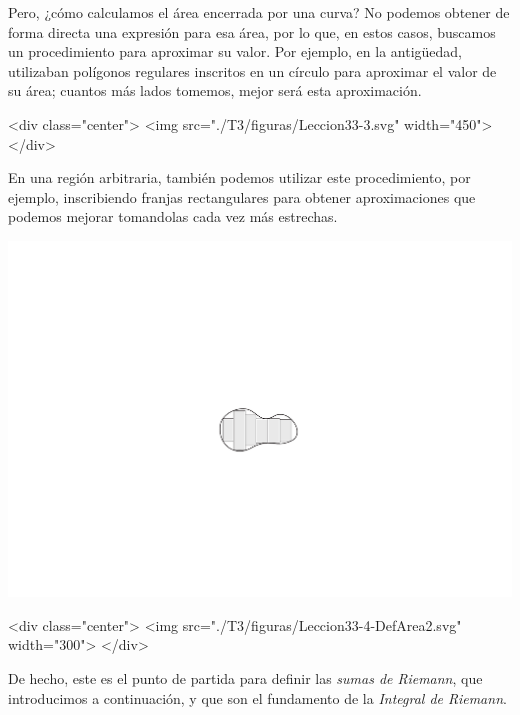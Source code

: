 Pero, ¿cómo calculamos el área encerrada por una curva?
No podemos obtener de forma directa una expresión para esa área, por lo que, en estos casos, buscamos un procedimiento para aproximar su valor.
Por ejemplo, en la antigüedad, utilizaban polígonos regulares inscritos en un círculo para aproximar el valor de su área; cuantos más lados tomemos, mejor será esta aproximación.

\begin{latexonly}
\begin{center}
\end{center}
\end{latexonly}
\begin{rawhtml}
<div class="center">
<img src="./T3/figuras/Leccion33-3.svg" width="450">
</div>
\end{rawhtml}


En una región arbitraria, también podemos utilizar este procedimiento, por ejemplo, inscribiendo franjas rectangulares para obtener aproximaciones que podemos mejorar tomandolas cada vez más estrechas.

\begin{latexonly}
\begin{center}
\includegraphics{T3/figs/DefArea2.pdf}
\end{center}
\end{latexonly}
\begin{rawhtml}
<div class="center">
<img src="./T3/figuras/Leccion33-4-DefArea2.svg" width="300">
</div>
\end{rawhtml}
%
De hecho, este es el punto de partida para definir las \emph{sumas de Riemann}, que introducimos a continuación, y que son el fundamento de la \emph{Integral de Riemann}.

